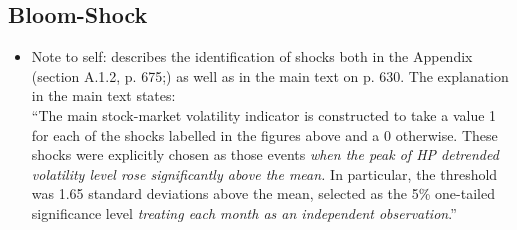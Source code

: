 \documentclass[a4paper,12pt,oneside,pointednumbers,numbers=noenddot,bibtotoc,bigheadings,liststotoc,chapterprefix=true]{scrbook}
\begin{document}
\subsection{Bloom-Shock}
\begin{itemize}
	\item Note to self: \citet{bloom:09} describes the identification of shocks both in the Appendix (section A.1.2, p. 675;) as well as in the main text on p. 630. The explanation in the main text states:\\
``The main stock-market volatility indicator is constructed to take a value 1 for each of the shocks labelled in the figures above and a 0 otherwise. These shocks were explicitly chosen as those events \textit{when the peak of HP detrended volatility level rose significantly above the mean.} In particular, the threshold was 1.65 standard deviations above the mean, selected as the 5\% one-tailed significance level \textit{treating each month as an independent observation}.''
\end{itemize}
\end{document}
